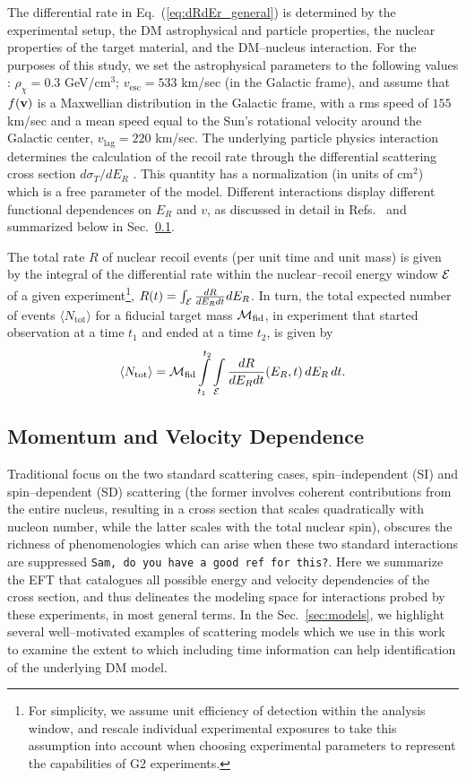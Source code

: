 \documentclass[11pt]{article}
\newcommand{\beq}{\begin{equation}} \newcommand{\eeq}{\end{equation}}
\newcommand{\Eq}[1]{Eq.~(\ref{#1})} \newcommand{\Eqs}[2]{Eqs.~(\ref{#1}) and (\ref{#2})} \newcommand{\Eqm}[2]{Eqs.~(\ref{#1}) through (\ref{#2})}
\newcommand{\Sec}[1]{Sec.~\ref{#1}} \newcommand{\Secs}[2]{Secs.~\ref{#1} and \ref{#2}} \newcommand{\Secm}[2]{Secs.~\ref{#1} through \ref{#2}}
\newcommand{\sjwColor}{red}
\newcommand{\sjwtt}[1]{{\color{\sjwColor}\tt #1}}
\begin{document}
The differential rate in \Eq{eq:dRdEr_general} is determined by the experimental setup, the DM astrophysical and particle properties, the nuclear properties of the target material, and the DM--nucleus interaction. For the purposes of this study, we set the astrophysical parameters to the following values \cite{Bovy:2013raa,Piffl:2013mla}: $\rho_\chi=0.3$ GeV/cm$^3$; $v_{\mathrm{esc}} = 533$ km/sec (in the Galactic frame), and assume that $f(\mathrm{\mbox{\bf{v}}})$ is a Maxwellian distribution in the Galactic frame, with a rms speed of $155$ km/sec and a mean speed equal to the Sun's rotational velocity around the Galactic center, $v_\textrm{lag}=220$ km/sec.
The underlying particle physics interaction determines the calculation of the recoil rate through the differential scattering cross section ${d\sigma_T}/{dE_R}$ \cite{Gluscevic:2015sqa,Gresham:2014vja}. This quantity has a normalization (in units of cm${}^2$) which is a free parameter of the model. Different interactions display different functional dependences on $E_R$ and $v$, as discussed in detail in Refs.~\cite{Gluscevic:2015sqa,Gresham:2014vja} and summarized below in \Sec{subsec:momentum_velocity}.

The total rate $R$ of nuclear recoil events (per unit time and unit mass) is given by the integral of the differential rate within the nuclear--recoil energy window ${\cal E}$ of a given experiment\footnote{For simplicity, we assume unit efficiency of detection within the analysis window, and rescale individual experimental exposures to take this assumption into account when choosing experimental parameters to represent the capabilities of G2 experiments.}, $R(t)=\int_{\cal E} \frac{dR}{dE_R dt} dE_R$. In turn, the total expected number of events $\langle N_\mathrm{tot}\rangle$ for a fiducial target mass ${\cal M}_\textrm{fid}$, in experiment that started observation at a time $t_1$ and ended at a time $t_2$, is given by
\beq \label{eq:totevents}
\langle N_\mathrm{tot}\rangle =  \cM_\textrm{fid} \int\limits_{t_1}^{t_2} \int\limits_\cE  \frac{dR}{dE_R dt}(E_R,t)\,dE_R \,dt.
\eeq


\subsection{Momentum and Velocity Dependence}
\label{subsec:momentum_velocity}

Traditional focus on the two standard scattering cases, spin--independent (SI) and spin--dependent (SD) scattering (the former involves coherent contributions from the entire nucleus, resulting in a cross section that scales quadratically with nucleon number, while the latter scales with the total nuclear spin), obscures the richness of phenomenologies which can arise when these two standard interactions are suppressed \cite{} \sjwtt{Sam, do you have a good ref for this?}. Here we summarize the EFT that catalogues all possible energy and velocity dependencies of the cross section, and thus delineates the modeling space for interactions probed by these experiments, in most general terms. In the \Sec{sec:models}, we highlight several well--motivated examples of scattering models which we use in this work to examine the extent to which including time information can help identification of the underlying DM model.
\end{document}
